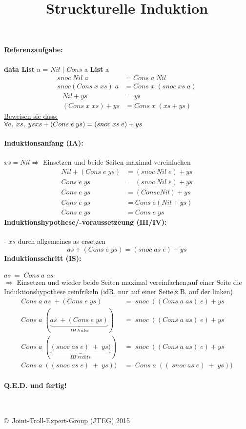 \documentclass{article}
\title{Struckturelle Induktion}
\date{ }
\begin{document}
	\maketitle
	\textbf{Referenzaufgabe:} \\
		\\
		\textbf{data List} a = $Nil$ $|$ $Cons$ a \textbf{List} a
		\begin{align*}
			snoc\;Nil\;a 			&= Cons\;a\;Nil\\
			snoc(Cons\;x\;xs)\;a	&= Cons\;x\;(snoc\;xs\;a)
		\end{align*}
		\begin{align*}
			Nil + ys 			&= ys\\
			(Cons\;x\;xs) + ys 	&= Cons\;x\;(xs + ys)
		\end{align*}
		\underline{Beweisen sie dass:}\\
		$\forall e,\;xs,\;ys\\xs+(Cons\;e\;ys) = (snoc\;xs\;e)+ys$ \\\\
	\textbf{Induktionsanfang (IA):}\\\\
		$xs = Nil$\;\;$\Rightarrow$ Einsetzen und beide Seiten maximal vereinfachen
	\begin{align*}
		Nil+(Cons\;e\;ys) 	&= (snoc\;Nil\;e)+ys\\
			 Cons\;e\;ys	&= (snoc\;Nil\;e)+ys\\
			 Cons\;e\;ys	&= (Cons e Nil) + ys\\
			 Cons\;e\;ys	&= Cons\;e (Nil + ys)\\
			 Cons\;e\;ys	&= Cons\;e\;ys
	\end{align*}
	\textbf{Induktionshypothese/-voraussetzeung (IH/IV):}\\\\
	- $xs$ durch allgemeines as ersetzen
	\[as+(Cons\;e\;ys) = (snoc\;as\;e)+ys\]
\newpage
	\textbf{Induktionsschritt (IS):}\\\\
	$as\;=\;Cons\;a\;as$\\$\Rightarrow$ Einsetzen und wieder beide Seiten maximal vereinfachen,auf einer Seite die Induktionshypothese reinfrikeln (idR. nur auf einer Seite,z.B. auf der linken)
	\begin{align*}
		Cons\;a\;as\;+(Cons\;e\;ys)\;&=\;snoc\;((Cons\;a\;as)\;e)+ys \\
		Cons\;a\;(\underbrace{as\;+(Cons\;e\;ys)}_{IH\;links})\;&=\;snoc\;((Cons\;a\;as)\;e)+ys\\
		Cons\;a\;(\underbrace{(snoc\;as\;e)\;+\;ys)}_{IH\;rechts})\;&=\;snoc\;((Cons\;a\;as)\;e)+ys\\
		Cons\;a\;((snoc\;as\;e)\;+\;ys))\;&=\;Cons\;a\;((\;snoc\;as\;e)\;+\;ys))
	\end{align*}\\
\textbf{Q.E.D. und fertig!}\\
\\\\
	\begin{tiny}
	\copyright\ Joint-Troll-Expert-Group (JTEG) 2015
	\end{tiny}
\end{document}
